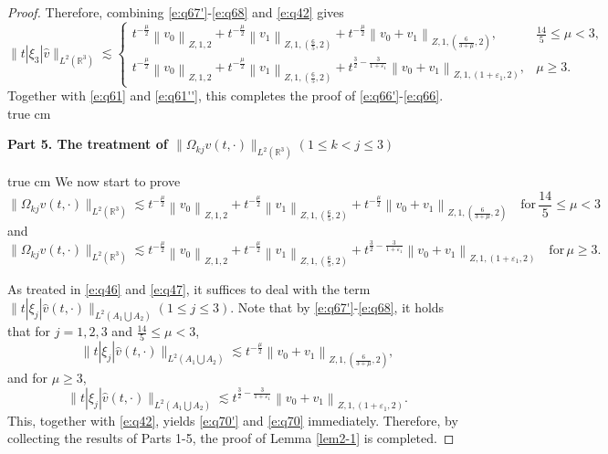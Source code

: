 \documentclass[11pt,twoside]{article}
\newcommand{\R}{\mathbb R}
\newcommand{\f}{\frac}
\theoremstyle{plain}
\theoremstyle{definition}
\theoremstyle{remark}
\numberwithin{equation}{section}
\begin{document}
\begin{proof}
Therefore, combining \eqref{e:q67'}-\eqref{e:q68} and \eqref{e:q42} gives
\begin{equation}\label{e:q69}
\|t|\xi_3|\hat{v}\|_{L^2(\R^3)} \lesssim\begin{cases} t^{-\f{\mu}{2}}\left\|v_0\right\|_{Z, 1, 2}+t^{-\f{\mu}{2}}\left\|v_1\right\|_{Z, 1,(\f65, 2)}+t^{-\f{\mu}{2}}\left\|v_0+v_1\right\|_{Z, 1,(\f{6}{3+\mu}, 2)},& \f{14}{5}\leq\mu<3,\\ t^{-\f{\mu}{2}}\left\|v_0\right\|_{Z, 1, 2}+t^{-\f{\mu}{2}}\left\|v_1\right\|_{Z, 1,(\f65, 2)}+t^{\f32-\f{3}{1+\varepsilon_1}}\left\|v_0+v_1\right\|_{Z, 1,(1+\varepsilon_1, 2)},& \mu\geq3.
\end{cases}
\end{equation}
Together with \eqref{e:q61} and \eqref{e:q61''}, this completes the proof of \eqref{e:q66'}-\eqref{e:q66}.
 true cm

{\bf Part 5.  The treatment of $\|\Omega_{kj}v(t, \cdot)\|_{L^2(\R^3)}$$(1\le k<j\le3)$ }

 true cm
We now start to prove
\begin{equation}\label{e:q70'}
\|\Omega_{kj}v(t, \cdot)\|_{L^2(\R^3)} \lesssim t^{-\f{\mu}{2}}\left\|v_0\right\|_{Z, 1, 2}+t^{-\f{\mu}{2}}\left\|v_1\right\|_{Z, 1,(\f65, 2)}+t^{-\f{\mu}{2}}\left\|v_0+v_1\right\|_{Z, 1,(\f{6}{3+\mu}, 2)}\quad \text{for}\, \f{14}{5}\leq\mu<3
\end{equation}
and
\begin{equation}\label{e:q70}
\|\Omega_{kj}v(t, \cdot)\|_{L^2(\R^3)} \lesssim t^{-\f{\mu}{2}}\left\|v_0\right\|_{Z, 1, 2}+t^{-\f{\mu}{2}}\left\|v_1\right\|_{Z, 1,(\f65, 2)}+t^{\f32-\f{3}{1+\varepsilon_1}}\left\|v_0+v_1\right\|_{Z, 1,(1+\varepsilon_1, 2)}\quad \text{for}\, \mu\geq3.
\end{equation}

As treated in \eqref{e:q46}  and \eqref{e:q47}, it suffices to deal with the term $\|t|\xi_j|\hat{v}(t, \cdot)\|_{L^2(A_1\bigcup A_2)}$$(1\leq j\leq3)$.
Note that by \eqref{e:q67'}-\eqref{e:q68}, it holds that for $j=1,2,3$ and $\f{14}{5}\leq\mu<3$,
$$
\|t|\xi_j|\hat{v}(t, \cdot)\|_{L^2(A_1\bigcup A_2)} \lesssim t^{-\f{\mu}{2}}\left\|v_0+v_1\right\|_{Z, 1,(\f{6}{3+\mu}, 2)},
$$
and for $\mu\geq3$,
$$
\|t|\xi_j|\hat{v}(t, \cdot)\|_{L^2(A_1\bigcup A_2)} \lesssim t^{\f32-\f{3}{1+\varepsilon_1}}\left\|v_0+v_1\right\|_{Z, 1,(1+\varepsilon_1, 2)}.
$$
This, together with \eqref{e:q42}, yields \eqref{e:q70'} and \eqref{e:q70} immediately.
Therefore, by collecting the results of  Parts 1-5, the proof of Lemma \ref{lem2-1} is completed.
\end{proof}
\end{document}
